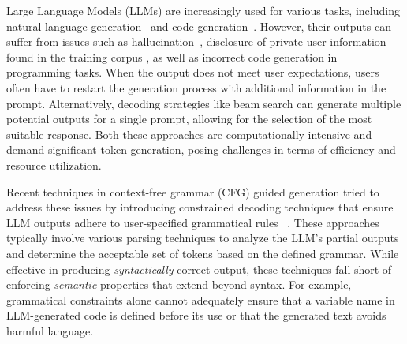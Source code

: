 
Large Language Models (LLMs) are increasingly used for various tasks, including natural language generation~\cite{radford2019language} and code generation~\cite{chen2021evaluatinglargelanguagemodels}.
However, their outputs can suffer from issues such as hallucination~\cite{xu2024hallucinationinevitableinnatelimitation}, disclosure of private user information found in the training corpus \cite{wang2023decodingtrust}, as well as incorrect code generation in programming tasks.
When the output does not meet user expectations, users often have to restart the generation process with additional information in the prompt.
Alternatively, decoding strategies like beam search can generate multiple potential outputs for a single prompt, allowing for the selection of the most suitable response.
Both these approaches are computationally intensive and demand significant token generation, posing challenges in terms of efficiency and resource utilization.

Recent techniques in context-free grammar (CFG) guided generation tried to address these issues by introducing constrained decoding techniques that ensure LLM outputs adhere to user-specified grammatical rules ~\cite{poesia2022synchromesh, willard2023efficient, guidance, geng2023grammar, ugare2024syncodellmgenerationgrammar, beurerkellner2024guiding}. 
These approaches typically involve various parsing techniques to analyze the LLM's partial outputs and determine the acceptable set of tokens {based on the defined grammar.}
While effective in producing \textit{syntactically} correct output, these techniques fall short of enforcing \textit{semantic} properties that extend beyond syntax.
For example, grammatical constraints alone cannot adequately ensure that a variable name in LLM-generated code is defined before its use or that the generated text avoids harmful language. 

